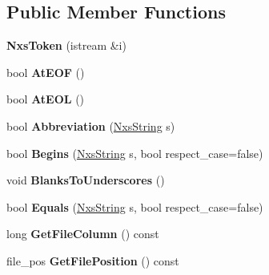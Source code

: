 \subsection*{Public Member Functions}
\begin{DoxyCompactItemize}
\item 
\hypertarget{classNxsToken_aa7932e5bf17ccae942e64d9cb1f6ae4c}{
{\bfseries NxsToken} (istream \&i)}
\label{classNxsToken_aa7932e5bf17ccae942e64d9cb1f6ae4c}

\item 
\hypertarget{classNxsToken_a54326092fbb2974720ddbc2ea176bb65}{
bool {\bfseries AtEOF} ()}
\label{classNxsToken_a54326092fbb2974720ddbc2ea176bb65}

\item 
\hypertarget{classNxsToken_ad2671eb776f8f76ac946fd5b76e93c0a}{
bool {\bfseries AtEOL} ()}
\label{classNxsToken_ad2671eb776f8f76ac946fd5b76e93c0a}

\item 
\hypertarget{classNxsToken_a27b278f4a91b233ec6412d1359ed4e04}{
bool {\bfseries Abbreviation} (\hyperlink{classNxsString}{NxsString} s)}
\label{classNxsToken_a27b278f4a91b233ec6412d1359ed4e04}

\item 
\hypertarget{classNxsToken_a8982d8c087b1c10ffd794c1689e0acea}{
bool {\bfseries Begins} (\hyperlink{classNxsString}{NxsString} s, bool respect\_\-case=false)}
\label{classNxsToken_a8982d8c087b1c10ffd794c1689e0acea}

\item 
\hypertarget{classNxsToken_adaffa5866ddf0a39a26a5e436183b9c5}{
void {\bfseries BlanksToUnderscores} ()}
\label{classNxsToken_adaffa5866ddf0a39a26a5e436183b9c5}

\item 
\hypertarget{classNxsToken_a339c42adadfab9d221581d6d64208b80}{
bool {\bfseries Equals} (\hyperlink{classNxsString}{NxsString} s, bool respect\_\-case=false)}
\label{classNxsToken_a339c42adadfab9d221581d6d64208b80}

\item 
\hypertarget{classNxsToken_a7272fd1469fa6424086a95ec4f92eab0}{
long {\bfseries GetFileColumn} () const }
\label{classNxsToken_a7272fd1469fa6424086a95ec4f92eab0}

\item 
\hypertarget{classNxsToken_a17e5caf91acc756c23159f76f8b2d0fd}{
file\_\-pos {\bfseries GetFilePosition} () const }
\label{classNxsToken_a17e5caf91acc756c23159f76f8b2d0fd}


\end{DoxyCompactItemize}
